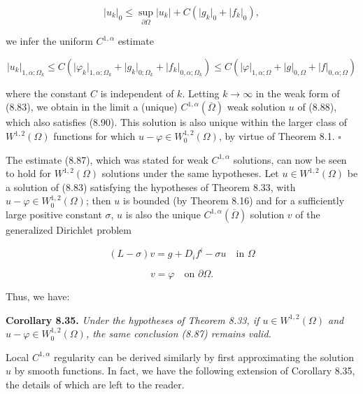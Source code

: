 \[
\lvert u_k \rvert_{0} \leq \sup_{\partial\Omega} \lvert u_k \rvert + C(\lvert g_k \rvert_{0} + \lvert f_k \rvert_{0}),
\]

we infer the uniform $C^{1,\alpha}$ estimate

\begin{equation}
\lvert u_k \rvert_{1,\alpha;\Omega_k}
\leq C(\lvert \varphi_k \rvert_{1,\alpha;\Omega_k} + \lvert g_k \rvert_{0;\Omega_k} + \lvert f_k \rvert_{0,\alpha;\Omega_k})
\leq C(\lvert \varphi \rvert_{1,\alpha;\Omega} + \lvert g \rvert_{0,\Omega} + \lvert f \rvert_{0,\alpha;\Omega})
\end{equation}

where the constant $C$ is independent of $k$. Letting $k \to \infty$ in the weak form of (8.83), we obtain in the limit a (unique) $C^{1,\alpha}(\overline{\Omega})$ weak solution $u$ of (8.88), which also satisfies (8.90). This solution is also unique within the larger class of $W^{1,2}(\Omega)$ functions for which $u - \varphi \in W_0^{1,2}(\Omega)$, by virtue of Theorem 8.1. $\square$

The estimate (8.87), which was stated for weak $C^{1,\alpha}$ solutions, can now be seen to hold for $W^{1,2}(\Omega)$ solutions under the same hypotheses. Let $u \in W^{1,2}(\Omega)$ be a solution of (8.83) satisfying the hypotheses of Theorem 8.33, with $u - \varphi \in W_0^{1,2}(\Omega)$; then $u$ is bounded (by Theorem 8.16) and for a sufficiently large positive constant $\sigma$, $u$ is also the unique $C^{1,\alpha}(\overline{\Omega})$ solution $v$ of the generalized Dirichlet problem

\[
(L - \sigma)v = g + D_i f^i - \sigma u \quad \text{in } \Omega
\]

\[
v = \varphi \quad \text{on } \partial\Omega.
\]




Thus, we have:

\medskip

\textbf{Corollary 8.35.} \textit{Under the hypotheses of Theorem 8.33, if $u \in W^{1,2}(\Omega)$ and $u-\varphi \in W^{1,2}_0(\Omega)$, the same conclusion (8.87) remains valid.}

\medskip

Local $C^{1,\alpha}$ regularity can be derived similarly by first approximating the solution $u$ by smooth functions. In fact, we have the following extension of Corollary 8.35, the details of which are left to the reader.

